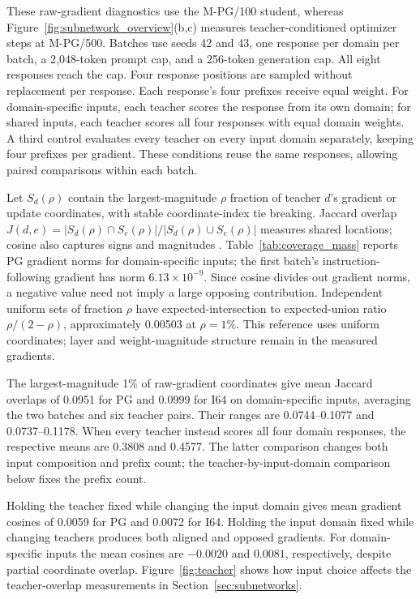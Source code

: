 These raw-gradient diagnostics use the M-PG/100 student, whereas Figure~\ref{fig:subnetwork_overview}(b,c) measures teacher-conditioned optimizer steps at M-PG/500. Batches use seeds 42 and 43, one response per domain per batch, a 2,048-token prompt cap, and a 256-token generation cap. All eight responses reach the cap. Four response positions are sampled without replacement per response. Each response's four prefixes receive equal weight. For domain-specific inputs, each teacher scores the response from its own domain; for shared inputs, each teacher scores all four responses with equal domain weights. A third control evaluates every teacher on every input domain separately, keeping four prefixes per gradient. These conditions reuse the same responses, allowing paired comparisons within each batch.

Let $S_d(\rho)$ contain the largest-magnitude $\rho$ fraction of teacher $d$'s gradient or update coordinates, with stable coordinate-index tie breaking. Jaccard overlap $J(d,e)=|S_d(\rho)\cap S_e(\rho)|/|S_d(\rho)\cup S_e(\rho)|$ measures shared locations; cosine also captures signs and magnitudes \citep{yu2026denseupdates}. Table~\ref{tab:coverage_mass} reports PG gradient norms for domain-specific inputs; the first batch's instruction-following gradient has norm $6.13\times10^{-9}$. Since cosine divides out gradient norms, a negative value need not imply a large opposing contribution. Independent uniform sets of fraction $\rho$ have expected-intersection to expected-union ratio $\rho/(2-\rho)$, approximately 0.00503 at $\rho=1\%$. This reference uses uniform coordinates; layer and weight-magnitude structure remain in the measured gradients.

The largest-magnitude 1\% of raw-gradient coordinates give mean Jaccard overlaps of 0.0951 for PG and 0.0999 for I64 on domain-specific inputs, averaging the two batches and six teacher pairs. Their ranges are 0.0744--0.1077 and 0.0737--0.1178. When every teacher instead scores all four domain responses, the respective means are 0.3808 and 0.4577. The latter comparison changes both input composition and prefix count; the teacher-by-input-domain comparison below fixes the prefix count.

Holding the teacher fixed while changing the input domain gives mean gradient cosines of 0.0059 for PG and 0.0072 for I64. Holding the input domain fixed while changing teachers produces both aligned and opposed gradients. For domain-specific inputs the mean cosines are $-0.0020$ and $0.0081$, respectively, despite partial coordinate overlap. Figure~\ref{fig:teacher} shows how input choice affects the teacher-overlap measurements in Section~\ref{sec:subnetworks}.

